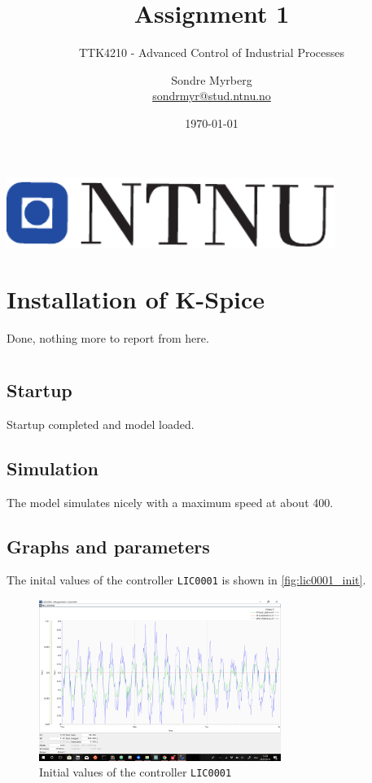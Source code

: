 \documentclass[a4paper]{scrartcl}
\title{Assignment 1}
\subtitle{TTK4210 - Advanced Control of Industrial Processes}
\author{Sondre Myrberg \\ \href{mailto:sondrmyr@stud.ntnu.no}{sondrmyr@stud.ntnu.no}}
\date{\today}
\begin{document}
\hypersetup{pageanchor=false}
\begin{titlepage}
    \maketitle
    \vfill
    \vfill
    \vfill
    \vfill
    \vfill
    \centering
    \includegraphics[width=0.8\textwidth]{../ntnu_logo.pdf}
    \vfill
    \vfill
\end{titlepage}
\hypersetup{pageanchor=true}

\section{Installation of K-Spice}
Done, nothing more to report from here.\\

\section{}
\subsection{Startup}
Startup completed and model loaded.\\
\subsection{Simulation}
The model simulates nicely with a maximum speed at about 400.\\
\subsection{Graphs and parameters}
The inital values of the controller \texttt{LIC0001} is shown in \autoref{fig:lic0001_init}.

\begin{figure}[ht!]
	\centering
	\includegraphics[width=0.7\textwidth]{fig/LIC0001_init.png}
	\caption{Initial values of the controller \texttt{LIC0001}}
	\label{fig:lic0001_init}
\end{figure}
\end{document}
